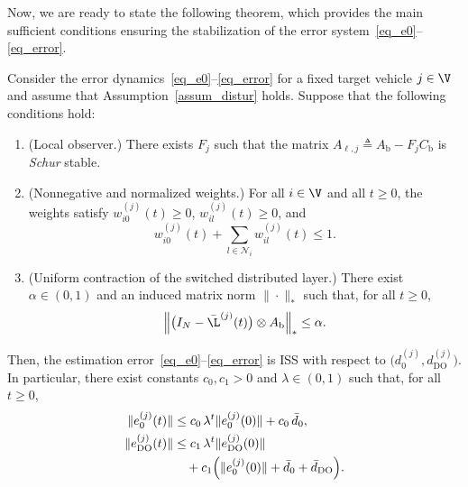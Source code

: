 Now, we are ready to state the following theorem, which provides the main sufficient conditions ensuring the stabilization of the error system~\eqref{eq_e0}--\eqref{eq_error}.
\begin{theorem}\label{thm_observer}
Consider the error dynamics~\eqref{eq_e0}--\eqref{eq_error} for a fixed target vehicle $j\in\V$ and assume that Assumption~\ref{assum_distur} holds. Suppose that the following conditions hold:
\begin{enumerate}
    \item (Local observer.) There exists $F_{j}$ such that the matrix
    $A_{\ell,j}\triangleq A_{\text{b}} - F_{j}C_{\text{b}}$ is {\it Schur} stable.
    \item (Nonnegative and normalized weights.) For all $i \in \V$ and all $t\ge 0$, the weights satisfy $w_{i0}^{(j)}(t)\ge 0$, $w_{il}^{(j)}(t)\ge 0$, and
    \begin{equation}\label{thm_W}
    w_{i0}^{(j)}(t)+\sum_{l\in \mathcal{N}_i} w_{il}^{(j)}(t) \leq 1.
    \end{equation}
    \item (Uniform contraction of the switched distributed layer.) There exist $\alpha \in (0,1)$ and an induced matrix norm $\| \cdot \|_*$ such that, for all $t\ge 0$,
	\begin{equation} \label{assume3}
        \Big\| \big( I_{N} - \bar{\L}^{(j)}(t) \big)  \otimes  A_{\text{b}} \Big\|_* \leq \alpha.
	\end{equation}
\end{enumerate}
Then, the estimation error~\eqref{eq_e0}--\eqref{eq_error} is ISS with respect to $\big(d_0^{(j)},d_{\mathrm{DO}}^{(j)}\big)$. In particular, there exist constants $c_0, c_1 > 0$ and $\lambda \in (0,1)$ such that, for all $t\ge 0$,
\begin{align}
\|e_0^{(j)}(t)\| &\le c_0\,\lambda^t \|e_0^{(j)}(0)\| + c_0\,\bar{d}_{0},\\
\|e_{\mathrm{DO}}^{(j)}(t)\| &\le c_1\,\lambda^t \|e_{\mathrm{DO}}^{(j)}(0)\| \notag\\
&\quad+ c_1 \Big(\|e_0^{(j)}(0)\| + \bar{d}_{0} + \bar{d}_{\mathrm{DO}}\Big).
\end{align}
\end{theorem}

